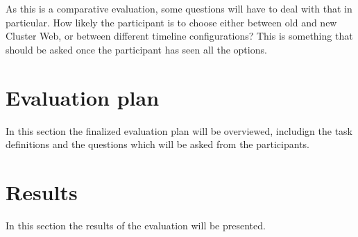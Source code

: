 As this is a comparative evaluation, some questions will have to deal with that in particular. How likely the participant is to choose either between old and new Cluster Web, or between different timeline configurations? This is something that should be asked once the participant has seen all the options.

\cite{bevanevaluation, rubin2008handbook, albert2013measuring}

\section{Evaluation plan}
In this section the finalized evaluation plan will be overviewed, includign the task definitions and the questions which will be asked from the participants.

\section{Results}
In this section the results of the evaluation will be presented.